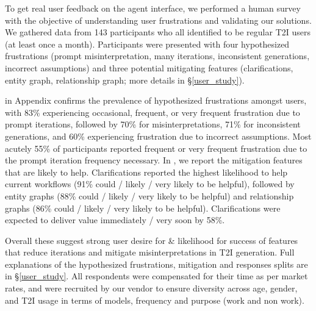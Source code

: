 To get real user feedback on the agent interface, we performed a human survey with the objective of understanding user frustrations and validating our solutions. We gathered data from 143 participants who all identified to be regular T2I users (at least once a month). Participants were presented with four hypothesized frustrations (prompt misinterpretation, many iterations, inconsistent generations, incorrect assumptions) and three potential mitigating features (clarifications, entity graph, relationship graph; more details in \S\ref{user_study}).
 
 in Appendix confirms the prevalence of hypothesized frustrations amongst users, with 83\% experiencing occasional, frequent, or very frequent frustration due to prompt iterations, followed by 70\% for misinterpretations, 71\% for inconsistent generations, and 60\% experiencing frustration due to incorrect assumptions. Most acutely 55\% of participants reported frequent or very frequent frustration due to the prompt iteration frequency necessary. In , we report the mitigation features that are likely to help. Clarifications reported the highest likelihood to help current workflows (91\% could / likely / very likely to be helpful), followed by entity graphs (88\% could / likely / very likely to be helpful) and relationship graphs (86\% could / likely / very likely to be helpful). Clarifications were expected to deliver value immediately / very soon by 58\%.

Overall these suggest strong user desire for \& likelihood for success of features that reduce iterations and mitigate misinterpretations in T2I generation.  Full explanations of the hypothesized frustrations, mitigation and responses splits are in \S\ref{user_study}. All respondents were compensated for their time as per market rates, and were recruited by our vendor to ensure diversity across age, gender, and T2I usage in terms of models, frequency and purpose (work and non work).












